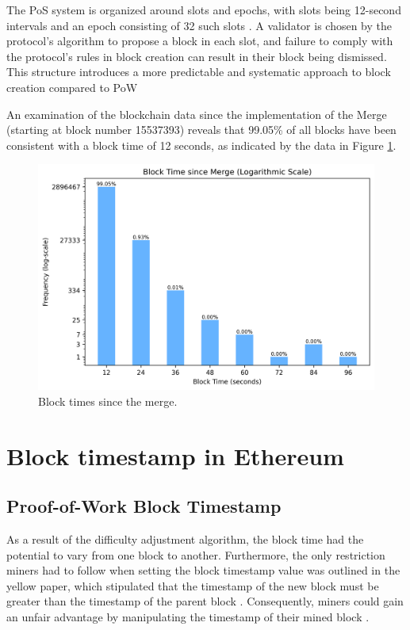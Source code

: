 The PoS system is organized around slots and epochs, with slots being 12-second
intervals and an epoch consisting of 32 such slots
\cite{seconds-per-slot-mainnet}\cite{seconds-per-slot-mainnet-doc}. A validator
is chosen by
the protocol's algorithm to propose a block in each slot, and failure to comply
with the protocol's rules in block creation can result in their block being
dismissed. This structure introduces a more predictable and systematic approach
to block creation compared to PoW

An examination of the blockchain data since the implementation of the Merge
(starting at block number 15537393) reveals that 99.05\% of all blocks have been
consistent with a block time of 12 seconds, as indicated by the data in Figure
\ref{fig:block_time_analysis}.

\begin{figure}[H]
  \centering
  \includegraphics[width=1\textwidth]{block_time_analysis/pos_block_time_bar_chart_with_percentages.png}
  \caption{Block times since the merge.}
  \label{fig:block_time_analysis}
\end{figure}

\section{Block timestamp in Ethereum}
\subsection{Proof-of-Work Block Timestamp}
As a result of the difficulty adjustment algorithm, the block time had the
potential to vary from one block to another. Furthermore, the only restriction
miners had to follow when setting the block timestamp value was outlined in the
yellow paper, which stipulated that the timestamp of the new block must be
greater than the timestamp of the parent block \cite{ethyellowpaper2023}.
Consequently, miners could gain an unfair advantage by manipulating the
timestamp of their mined block \cite{swc116}.



